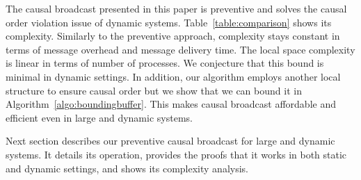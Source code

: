 The causal broadcast presented in this paper is preventive and solves the causal
order violation issue of dynamic systems.  Table~\ref{table:comparison} shows
its complexity. Similarly to the preventive approach, complexity stays constant
in terms of message overhead and message delivery time. The local space
complexity is linear in terms of number of processes. We conjecture that this
bound is minimal in dynamic settings. In addition, our algorithm employs another
local structure to ensure causal order but we show that we can bound it in
Algorithm~\ref{algo:boundingbuffer}. This makes causal broadcast affordable and
efficient even in large and dynamic systems.

Next section describes our preventive causal broadcast for large and dynamic
systems. It details its operation, provides the proofs that it works in both
static and dynamic settings, and shows its complexity analysis.



